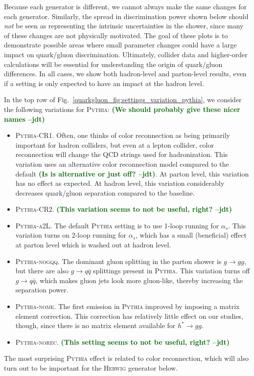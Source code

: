 \documentclass[11pt]{cernrep}
\newcommand{\jdt}[1]{\textbf{\textcolor{darkgreen}{(#1 --jdt)}}}
\begin{document}
Because each generator is different, we cannot always make the same changes for each generator.  Similarly, the spread in discrimination power shown below should \emph{not} be seen as representing the intrinsic uncertainties in the shower, since many of these changes are not physically motivated.  The goal of these plots is to demonstrate possible areas where small parameter changes could have a large impact on quark/gluon discrimination.  Ultimately, collider data and higher-order calculations will be essential for understanding the origin of quark/gluon differences.  In all cases, we show both hadron-level and parton-level results, even if a setting is only expected to have an impact at the hadron level.  


In the top row of Fig.~\ref{quarkgluon_fig:settings_variation_pythia}, we consider the following variations for  \textsc{Pythia}:  \jdt{We should probably give these nicer names}
\begin{itemize}
\item \textsc{Pythia-CR1}.  Often, one thinks of color reconnection as being primarily important for hadron colliders, but even at a lepton collider, color reconnection will change the QCD strings used for hadronization.  This variation uses an alternative color reconnection model compared to the default \jdt{Is is alternative or just off?}.  At parton level, this variation has no effect as expected.  At hadron level, this variation considerably decreases quark/gluon separation compared to the baseline.
\item \textsc{Pythia-CR2}.  \jdt{This variation seems to not be useful, right?}
\item \textsc{Pythia-a2L}.  The default \textsc{Pythia} setting is to use 1-loop running for $\alpha_s$.  This variation turns on 2-loop running for $\alpha_s$, which has a small (beneficial) effect at parton level which is washed out at hadron level.
\item \textsc{Pythia-nogqq}.  The dominant gluon splitting in the parton shower is $g \to gg$, but there are also $g \to q \bar{q}$ splittings present in \textsc{Pythia}.  This variation turns off $g \to q \bar{q}$, which makes gluon jets look more gluon-like, thereby increasing the separation power.
\item \textsc{Pythia-nome}.  The first emission in \textsc{Pythia} improved by imposing a matrix element correction.  This correction has relatively little effect on our studies, though, since there is no matrix element available for $h^* \to g g$.
\item \textsc{Pythia-norec}.  \jdt{This setting seems to not be useful, right?}
\end{itemize}
The most surprising \textsc{Pythia} effect is related to color reconnection, which will also turn out to be important for the \textsc{Herwig} generator below.
\end{document}
